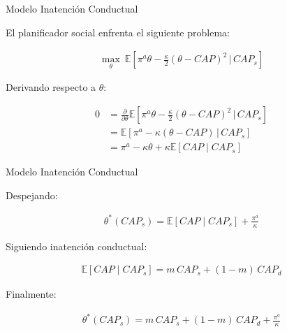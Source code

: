 \documentclass[xcolor=dvipsnames]{beamer}
\begin{document}





\begin{frame}{Modelo Inatención Conductual}

\small

El planificador social enfrenta el siguiente problema:

\begin{align*}
\max_{\theta} \ \mathbb{E} \left[ 
\pi^a \theta - \frac{\kappa}{2}(\theta - CAP)^2 
\,\bigg|\, CAP_s \right]
\end{align*}

Derivando respecto a $\theta$:

\begin{align*}
0 
&= \frac{\partial}{\partial \theta}
\mathbb{E} \left[ 
\pi^a \theta - \frac{\kappa}{2}(\theta - CAP)^2 
\,\bigg|\, CAP_s \right] \\
&= \mathbb{E} \left[ 
\pi^a - \kappa(\theta - CAP) 
\,\bigg|\, CAP_s \right] \\
&= \pi^a - \kappa \theta + \kappa \mathbb{E}[CAP \mid CAP_s]
\end{align*}

\end{frame}





\begin{frame}{Modelo Inatención Conductual}

\small

Despejando:

\begin{align*}
\theta^*(CAP_s) 
= \mathbb{E}[CAP \mid CAP_s] + \frac{\pi^a}{\kappa}
\end{align*}

Siguiendo inatención conductual:

\begin{align*}
\mathbb{E}[CAP \mid CAP_s] 
= m\,CAP_s + (1-m)\,CAP_d
\end{align*}

Finalmente:

\begin{align*}
\boxed{
\theta^*(CAP_s) 
= m\,CAP_s + (1-m)\,CAP_d + \frac{\pi^a}{\kappa}
}
\end{align*}

\end{frame}
\end{document}
